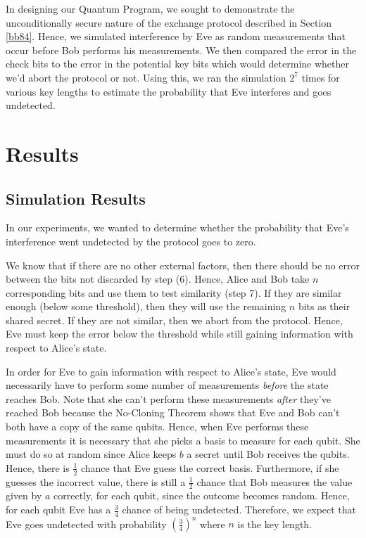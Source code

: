 \documentclass[12]{amsart}
\begin{document}
In designing our Quantum Program, we sought to demonstrate the unconditionally secure nature of the exchange protocol described in Section \ref{bb84}. Hence, we simulated interference by Eve as random measurements that occur before Bob performs his measurements. We then compared the error in the check bits to the error in the potential key bits which would determine whether we'd abort the protocol or not. Using this, we ran the simulation $2^{7}$ times for various key lengths to estimate the probability that Eve interferes and goes undetected.

\section{Results}

\subsection{Simulation Results}

In our experiments, we wanted to determine whether the probability that Eve's interference went undetected by the protocol goes to zero. 

We know that if there are no other external factors, then there should be no error between the bits not discarded by step (6). Hence, Alice and Bob take $n$ corresponding bits and use them to test similarity (step 7). If they are similar enough (below some threshold), then they will use the remaining $n$ bits as their shared secret. If they are not similar, then we abort from the protocol. Hence, Eve must keep the error below the threshold while still gaining information with respect to Alice's state.

In order for Eve to gain information with respect to Alice's state, Eve would necessarily have to perform some number of measurements \textit{before} the state reaches Bob. Note that she can't perform these measurements \textit{after} they've reached Bob because the No-Cloning Theorem shows that Eve and Bob can't both have a copy of the same qubits\cite{lindblad1999general}. Hence, when Eve performs these measurements it is necessary that she picks a basis to measure for each qubit. She must do so at random since Alice keeps $b$ a secret until Bob receives the qubits. Hence, there is $\frac{1}{2}$ chance that Eve guess the correct basis. Furthermore, if she guesses the incorrect value, there is still a $\frac{1}{2}$ chance that Bob measures the value given by $a$ correctly, for each qubit, since the outcome becomes random. Hence, for each qubit Eve has a $\frac{3}{4}$ chance of being undetected. Therefore, we expect that Eve goes undetected with probability $(\frac{3}{4})^n$ where $n$ is the key length.
\end{document}
